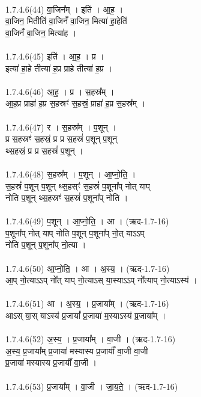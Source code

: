 \\
1.7.4.6(44)  वा॒जिन᳚म् । इति॑ । आ॒ह॒ ।\\
वा॒जिन॒ मितीति॑ वा॒जिनँ॑ वा॒जिन॒ मित्या॑ हा॒हेति॑ \\
वा॒जिनँ॑ वा॒जिन॒ मित्या॑ह ।\\
\\
1.7.4.6(45)  इति॑ । आ॒ह॒ । प्र ।\\
इत्या॑ हा॒हे तीत्या॑ ह॒प्र प्राहे तीत्या॑ ह॒प्र ।\\
\\
1.7.4.6(46)  आ॒ह॒ । प्र । स॒हस्र᳚म् ।\\
आ॒ह॒प्र प्राहा॑ ह॒प्र स॒हस्रꣳ॑ स॒हस्रं॒ प्राहा॑ ह॒प्र स॒हस्र᳚म् ।\\
\\
1.7.4.6(47)  र । स॒हस्र᳚म् । प॒शून् ।\\
प्र स॒हस्रꣳ॑ स॒हस्रं॒ प्र प्र स॒हस्रं॑ प॒शून् प॒शून्\\
थ्स॒हस्रं॒ प्र प्र स॒हस्रं॑ प॒शून् ।\\
\\
1.7.4.6(48)  स॒हस्र᳚म् । प॒शून् । आ॒प्नो॒ति॒ ।\\
स॒हस्रं॑ प॒शून् प॒शून् थ्स॒हस्ꣳ॑ स॒हस्रं॑ प॒शूना᳚प् नोत् याप्\\
नोति प॒शून् थ्स॒हस्रꣳ॑ स॒हस्रं॑ प॒शूना᳚प् नोति ।\\
\\
1.7.4.6(49)  प॒शून् । आ॒प्नो॒ति॒ । आ । (ऋद-1.7-16)\\
प॒शूना᳚प् नोत् याप् नोति प॒शून् प॒शूना᳚प् नो॒त् याऽऽप्\\
नो॑ति प॒शून् प॒शूना᳚प् नो॒त्या ।\\
\\
1.7.4.6(50)  आ॒प्नो॒ति॒ । आ । अ॒स्य॒ । (ऋद-1.7-16)\\
आ॒प् नो॒त्याऽऽप् नो᳚त् याप् नो॒त्याऽस् या॒स्याऽऽप् नो᳚त्याप् नो॒त्याऽस्य॑ ।\\
\\
1.7.4.6(51)  आ । अ॒स्य॒ । प्र॒जाया᳚म् । (ऋद-1.7-16)\\
आऽस् या॒स् याऽस्य॑ प्र॒जायां᳚ प्र॒जाया॑ म॒स्याऽस्य॑ प्र॒जाया᳚म् ।\\
\\
1.7.4.6(52)  अ॒स्य॒ । प्र॒जाया᳚म् । वा॒जी । (ऋद-1.7-16)\\
अ॒स्य॒ प्र॒जाया᳚म् प्र॒जाया॑ मस्यास्य प्र॒जायाँ᳚ वा॒जी वा॒जी\\
प्र॒जाया॑ मस्यास्य प्र॒जायाँ᳚ वा॒जी ।\\
\\
1.7.4.6(53)  प्र॒जाया᳚म् । वा॒जी । जा॒य॒ते॒ । (ऋद-1.7-16)\\
